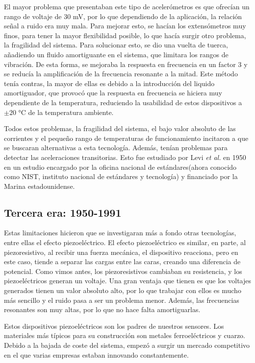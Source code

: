 \documentclass[12pt]{book}
\numberwithin{equation}{section}
\begin{document}
El mayor problema que presentaban este tipo de acelerómetros es que ofrecían un rango de voltaje de 30 mV, por lo que dependiendo de la aplicación, la relación señal a ruido era muy mala. Para mejorar esto, se hacían los extensómetros muy finos, para tener la mayor flexibilidad posible, lo que hacía surgir otro problema, la fragilidad del sistema. Para solucionar esto, se dio una vuelta de tuerca, añadiendo un fluido amortiguante en el sistema, que limitara los rangos de vibración. De esta forma, se mejoraba la respuesta en frecuencia en un factor 3 y se reducía la amplificación de la frecuencia resonante a la mitad. Este método tenía contras, la mayor de ellas es debido a la introducción del liquido amortiguador, que provocó que la respuesta en frecuencia se hiciera muy dependiente de la temperatura, reduciendo la usabilidad de estos dispositivos a $\pm 20$ °C de la temperatura ambiente.

Todos estos problemas, la fragilidad del sistema, el bajo valor absoluto de las corrientes y el pequeño rango de temperaturas de funcionamiento incitaron a que se buscaran alternativas a esta tecnología. Además, tenían problemas para detectar las aceleraciones transitorias. Esto fue estudiado por Levi \textit{et al.}\cite{levy} en 1950 en un estudio encargado por la oficina nacional de estándares(ahora conocido como NIST, instituto nacional de estándares y tecnología) y financiado por la Marina estadounidense. 

\subsection{Tercera era: 1950-1991}

Estas limitaciones hicieron que se investigaran más a fondo otras tecnologías, entre ellas el efecto piezoeléctrico. El efecto piezoeléctrico es similar, en parte, al piezoresistivo, al recibir una fuerza mecánica, el dispositivo reacciona, pero  en este caso, tiende a separar las cargas entre las caras, creando una diferencia de potencial. Como vimos antes, los piezoresistivos cambiaban  su resistencia, y los piezoeléctricos generan un voltaje. Una gran ventaja que tienen es que los voltajes generados tienen un valor absoluto alto, por lo que trabajar con ellos es mucho más sencillo y el ruido pasa a ser un problema menor. Además, las frecuencias resonantes son muy altas, por lo que no hace falta amortiguarlas.

Estos dispositivos piezoeléctricos son los padres de nuestros sensores. Los materiales más típicos para su construcción son metales ferroeléctricos y cuarzo. Debido a la bajada de coste del sistema, empezó a surgir un mercado competitivo en el que varias empresas estaban innovando constantemente.
\end{document}

